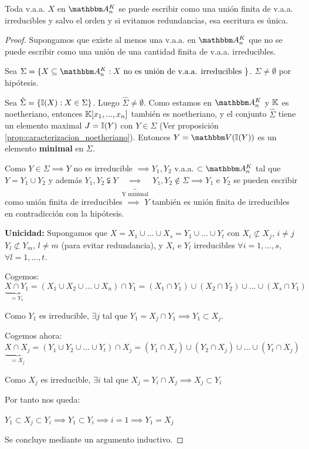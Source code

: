 \begin{theorem}
	Toda v.a.a. $X$ en $\Akn$ se puede escribir como una unión finita de v.a.a. irreducibles y salvo el orden y si evitamos redundancias, esa escritura es única.
\end{theorem}

\begin{proof}
	Supongamos que existe al menos una v.a.a. en $\Akn$ que no se puede escribir como una unión de una cantidad finita de v.a.a. irreducibles.

	Sea $\Sigma=\{ X \subseteq \Akn: X \text{ no es unión de v.a.a. irreducibles }\}$. $\Sigma \neq \emptyset$ por hipótesis.

	Sea $\hat{\Sigma}=\{\mathbb{I}(X): X \in \Sigma\}$. Luego $\hat{\Sigma} \neq \emptyset$. Como estamos en $\Akn$ y $\mathbb{K}$ es noetheriano, entonces $\mathbb{K}[x_1,...,x_n]$ también es noetheriano, y el conjunto $\hat{\Sigma}$ tiene un elemento maximal $J=\mathbb{I}(Y)$ con $Y \in \Sigma$ (Ver proposición \ref{prop:caracterizacion_noetheriano}). Entonces $Y=\V(\I(Y))$ es un elemento \textbf{minimal} en $\Sigma$.
	
	Como $Y \in \Sigma \implies Y$ no es irreducible $\implies Y_1,Y_2$ v.a.a. $\subset \Akn$ tal que $Y=Y_1 \cup Y_2$ y además $Y_1,Y_2 \subsetneqq Y \underbrace{\implies}_{\text{ Y minimal }} Y_1, Y_2 \notin \Sigma \implies  Y_1$ e $Y_2$ se pueden escribir como unión finita de irreducibles $\implies$ $Y$ también es unión finita de irreducibles en contradicción con la hipótesis.
	
	\textbf{Unicidad:} Supongamos que $X=X_1\cup...\cup X_s=Y_1 \cup...\cup Y_t$ con $X_i \not \subset X_j$,  $i \neq j$ $Y_l \not \subset Y_m$, $l \neq m$ (para evitar redundancia),  y $X_i$ e $Y_l$ irreducibles $\forall i=1,...,s$, $\forall l=1,...,t$.
	
	Cogemos:
	$$ \underbrace{X\cap Y_1}_{=Y_1}=(X_1 \cup X_2 \cup ... \cup X_n) \cap Y_1 = (X_1 \cap Y_1) \cup (X_2 \cap Y_2) \cup ... \cup (X_s \cap Y_1)$$
	
	Como $Y_1$ es irreducible, $\exists j$ tal que $Y_1=X_j \cap Y_1 \implies Y_1 \subset X_j$.
	
	Cogemos ahora:
	$$ \underbrace{X \cap X_j}_{= X_j} = (Y_1 \cup Y_2 \cup ... \cup Y_t) \cap X_j = (Y_1 \cap X_j) \cup (Y_2 \cap X_j) \cup ... \cup (Y_t \cap X_j)$$
	
	Como $X_j$ es irreducible, $\exists i$ tal que $X_j=Y_i \cap X_j \implies X_j \subset Y_i$
	
	Por tanto nos queda: 
	
	$Y_1 \subset X_j \subset Y_i \implies Y_1 \subset Y_i \implies i=1 \implies Y_1 = X_j$
	
	Se concluye mediante un argumento inductivo.
\end{proof}

